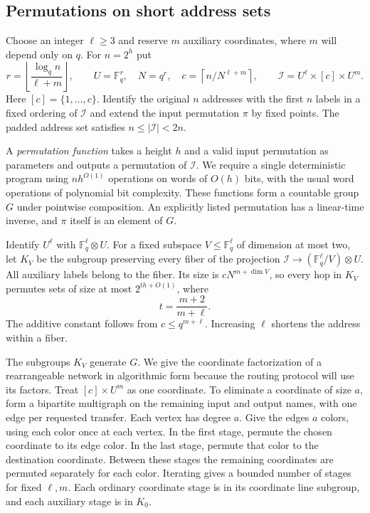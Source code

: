 \subsection{Permutations on short address sets}

Choose an integer $\ell\ge3$ and reserve $m$ auxiliary coordinates,
where $m$ will depend only on $q$. For $n=2^h$ put
\[
 r=\left\lfloor \frac{\log_q n}{\ell+m}\right\rfloor,\qquad
 U=\mathbb F_q^r,\quad N=q^r,\quad
 c=\left\lceil n/N^{\ell+m}\right\rceil,\qquad
 \mathcal I=U^\ell\times[c]\times U^m .
\]
Here $[c]=\{1,\ldots,c\}$. Identify the original $n$ addresses with
the first $n$ labels in a fixed ordering of $\mathcal I$ and extend
the input permutation $\pi$ by fixed points. The padded address set
satisfies $n\le|\mathcal I|<2n$.

A \emph{permutation function} takes a height $h$ and a valid input
permutation as parameters and outputs a permutation of $\mathcal I$.
We require a single deterministic program using $nh^{O(1)}$ operations
on words of $O(h)$ bits, with the usual word operations of polynomial
bit complexity. These functions form a countable group $G$ under
pointwise composition. An explicitly listed permutation has a
linear-time inverse, and $\pi$ itself is an element of $G$.

Identify $U^\ell$ with $\mathbb F_q^\ell\otimes U$. For a fixed
subspace $V\le\mathbb F_q^\ell$ of dimension at most two, let $K_V$
be the subgroup preserving every fiber of the projection
$\mathcal I\to(\mathbb F_q^\ell/V)\otimes U$. All auxiliary labels
belong to the fiber. Its size is $cN^{m+\dim V}$, so every hop in
$K_V$ permutes sets of size at most $2^{th+O(1)}$, where
\begin{equation}\label{eq:sort-hop-height}
                         t=\frac{m+2}{m+\ell}.
\end{equation}
The additive constant follows from $c\le q^{m+\ell}$. Increasing
$\ell$ shortens the address within a fiber.

The subgroups $K_V$ generate $G$. We give the coordinate factorization
of a rearrangeable network \cite{benes} in algorithmic form because
the routing protocol will use its factors. Treat $[c]\times U^m$ as
one coordinate. To eliminate a coordinate of size $a$, form a bipartite
multigraph on the remaining input and output names, with one edge per
requested transfer. Each vertex has degree $a$. Give the edges $a$
colors, using each color once at each vertex. In the first stage,
permute the chosen coordinate to its edge color. In the last stage,
permute that color to the destination coordinate. Between these stages
the remaining coordinates are permuted separately for each color.
Iterating gives a bounded number of stages for fixed $\ell,m$.
Each ordinary coordinate stage is in its coordinate line subgroup,
and each auxiliary stage is in $K_0$.

